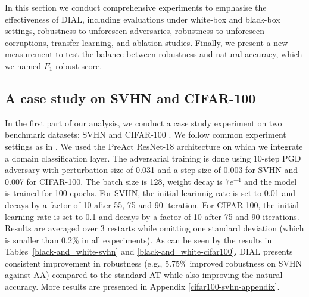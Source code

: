 In this section we conduct comprehensive experiments to emphasise the effectiveness of DIAL, including evaluations under white-box and black-box settings, robustness to unforeseen adversaries, robustness to unforeseen corruptions, transfer learning, and ablation studies. Finally, we present a new measurement to test the balance between robustness and natural accuracy, which we named $F_1$-robust score. 


\subsection{A case study on SVHN and CIFAR-100}
In the first part of our analysis, we conduct a case study experiment on two benchmark datasets: SVHN \citep{netzer2011reading} and CIFAR-100 \cite{krizhevsky2009learning}. We follow common experiment settings as in \cite{rice2020overfitting, wu2020adversarial}. We used the PreAct ResNet-18 \citep{he2016identity} architecture on which we integrate a domain classification layer. The adversarial training is done using 10-step PGD adversary with perturbation size of 0.031 and a step size of 0.003 for SVHN and 0.007 for CIFAR-100. The batch size is 128, weight decay is $7e^{-4}$ and the model is trained for 100 epochs. For SVHN, the initial learinnig rate is set to 0.01 and decays by a factor of 10 after 55, 75 and 90 iteration. For CIFAR-100, the initial learning rate is set to 0.1 and decays by a factor of 10 after 75 and 90 iterations. 
Results are averaged over 3 restarts while omitting one standard deviation (which is smaller than 0.2\% in all experiments). As can be seen by the results in Tables~\ref{black-and_white-svhn} and \ref{black-and_white-cifar100}, DIAL presents consistent improvement in robustness (e.g., 5.75\% improved robustness on SVHN against AA) compared to the standard AT 
while also improving the natural accuracy. More results are presented in Appendix \ref{cifar100-svhn-appendix}.


